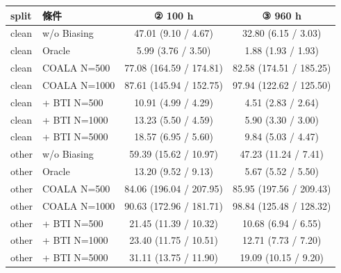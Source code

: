 \documentclass[11pt,a4paper]{article}
\begin{document}
\begin{center}
{\small
\begin{tabular}{llcc}
\toprule
\textbf{split} & \textbf{條件} & \textbf{② 100 h} & \textbf{③ 960 h} \\
\midrule
clean & w/o Biasing & 47.01 (9.10 / 4.67) & 32.80 (6.15 / 3.03) \\
clean & Oracle & 5.99 (3.76 / 3.50) & 1.88 (1.93 / 1.93) \\
clean & COALA N=500 & 77.08 (164.59 / 174.81) & 82.58 (174.51 / 185.25) \\
clean & COALA N=1000 & 87.61 (145.94 / 152.75) & 97.94 (122.62 / 125.50) \\
clean & + BTI N=500 & 10.91 (4.99 / 4.29) & 4.51 (2.83 / 2.64) \\
clean & + BTI N=1000 & 13.23 (5.50 / 4.59) & 5.90 (3.30 / 3.00) \\
clean & + BTI N=5000 & 18.57 (6.95 / 5.60) & 9.84 (5.03 / 4.47) \\
\midrule
other & w/o Biasing & 59.39 (15.62 / 10.97) & 47.23 (11.24 / 7.41) \\
other & Oracle & 13.20 (9.52 / 9.13) & 5.67 (5.52 / 5.50) \\
other & COALA N=500 & 84.06 (196.04 / 207.95) & 85.95 (197.56 / 209.43) \\
other & COALA N=1000 & 90.63 (172.96 / 181.71) & 98.84 (125.48 / 128.32) \\
other & + BTI N=500 & 21.45 (11.39 / 10.32) & 10.68 (6.94 / 6.55) \\
other & + BTI N=1000 & 23.40 (11.75 / 10.51) & 12.71 (7.73 / 7.20) \\
other & + BTI N=5000 & 31.11 (13.75 / 11.90) & 19.09 (10.15 / 9.20) \\
\bottomrule
\end{tabular}
}
\end{center}
\end{document}
